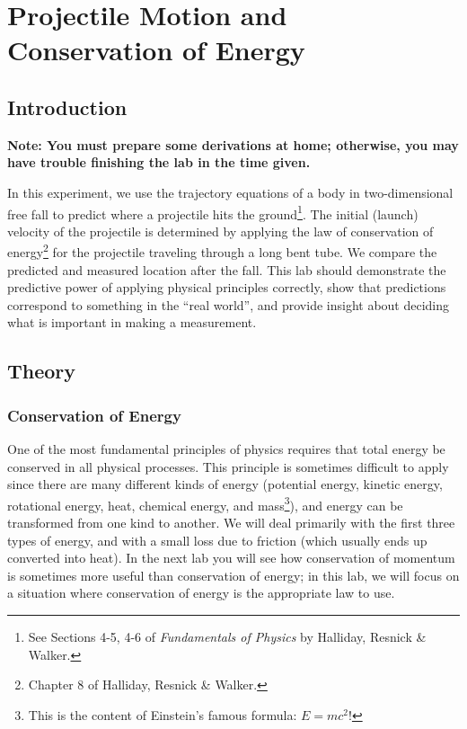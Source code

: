 \chapter{Projectile Motion and Conservation of Energy}
\label{chap:projectile}
\section{Introduction}
\textbf{Note: You must prepare some derivations at home; otherwise, you may have trouble finishing the lab in the time given.}\myskip

In this experiment, we use the trajectory equations of a body in two-dimensional free fall to predict where a projectile hits the ground\footnote{See Sections 4-5, 4-6 of \emph{Fundamentals of Physics} by Halliday, Resnick \& Walker.}. The initial (launch) velocity of the projectile is determined by applying the law of conservation of energy\footnote{Chapter 8 of Halliday, Resnick \& Walker.} for the projectile traveling through a long bent tube. We compare the predicted and measured location after the fall. This lab should demonstrate the predictive power of applying physical principles correctly, show that predictions correspond to something in the ``real world'', and provide insight about deciding what is important in making a measurement.\myskip

\section{Theory}
\subsection{Conservation of Energy}
One of the most fundamental principles of physics requires that total energy be conserved in all physical processes. This principle is sometimes difficult to apply since there are many different kinds of energy (potential energy, kinetic energy, rotational energy, heat, chemical energy, and mass\footnote{This is the content of Einstein's famous formula: $E=mc^2$!}), and energy can be transformed from one kind to another. We will deal primarily with the first three types of energy, and with a small loss due to friction (which usually ends up converted into heat). In the next lab you will see how conservation of momentum is sometimes more useful than conservation of energy; in this lab, we will focus on a situation where conservation of energy is the appropriate law to use.\myskip

